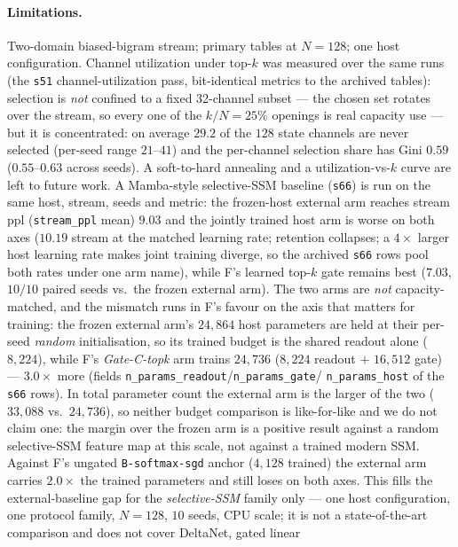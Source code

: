\documentclass[preprint,12pt]{elsarticle}
\begin{document}
\paragraph{Limitations.}
Two-domain biased-bigram stream; primary tables at $N=128$; one host
configuration. Channel utilization under top-$k$ was measured over the
same runs (the \texttt{s51} channel-utilization pass, bit-identical
metrics to the archived tables): selection is \emph{not} confined to
a fixed 32-channel subset --- the chosen set rotates over the stream,
so every one of the $k/N=25\%$ openings is real capacity use --- but
it is concentrated: on average $29.2$ of the $128$ state channels are
never selected (per-seed range $21$--$41$) and the per-channel
selection share has Gini $0.59$ ($0.55$--$0.63$ across seeds). A
soft-to-hard annealing and a utilization-vs-$k$ curve are left to
future work. A Mamba-style selective-SSM baseline
(\texttt{s66}) is run on the same host, stream, seeds and
metric: the frozen-host external arm reaches stream ppl
(\texttt{stream\_ppl} mean) $9.03$ and the
jointly trained host arm is worse on both axes ($10.19$ stream at the
matched learning rate; retention collapses; a $4\times$ larger host
learning rate makes joint training diverge, so the archived
\texttt{s66} rows pool both rates under one arm name), while F's
learned top-$k$ gate remains best
($7.03$, $10/10$ paired seeds vs.\ the frozen external arm). The two
arms are \emph{not} capacity-matched, and the mismatch runs in F's
favour on the axis that matters for training: the frozen external
arm's $24{,}864$ host parameters are held at their per-seed
\emph{random} initialisation, so its trained budget is the shared
readout alone ($8{,}224$), while F's \emph{Gate-C-topk} arm trains
$24{,}736$ ($8{,}224$ readout $+$ $16{,}512$ gate) --- $3.0\times$
more (fields \texttt{n\_params\_readout}/\texttt{n\_params\_gate}/
\texttt{n\_params\_host} of the \texttt{s66} rows). In total parameter
count the external arm is the larger of the two ($33{,}088$ vs.\
$24{,}736$), so neither budget comparison is like-for-like and we do
not claim one: the margin over the frozen arm is a positive result
against a random selective-SSM feature map at this scale, not against
a trained modern SSM. Against F's ungated \texttt{B-softmax-sgd}
anchor ($4{,}128$ trained) the external arm carries $2.0\times$ the
trained parameters and still loses on both axes. This fills the
external-baseline gap for the
\emph{selective-SSM} family only --- one host configuration, one
protocol family, $N=128$, $10$ seeds, CPU scale; it is not a
state-of-the-art comparison and does not cover DeltaNet, gated linear
\end{document}
